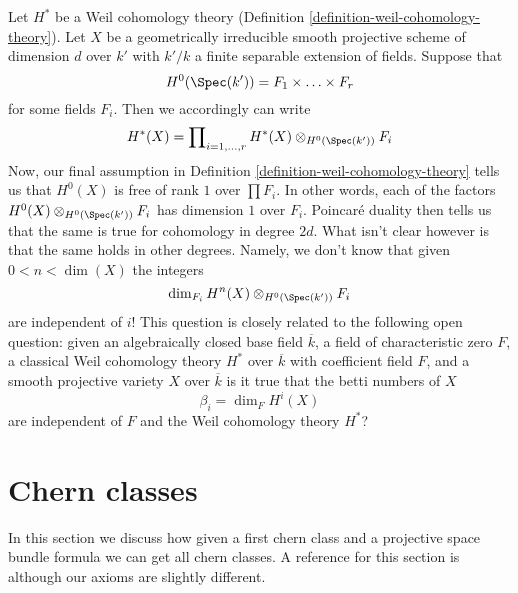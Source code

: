 \begin{remark}
\label{remark-betti-numbers-in-some-sense}
Let $H^*$ be a Weil cohomology theory
(Definition \ref{definition-weil-cohomology-theory}).
Let $X$ be a geometrically irreducible smooth projective scheme
of dimension $d$ over $k'$ with $k'/k$ a finite separable extension of fields.
Suppose that
$$
H^0(\Spec(k')) = F_1 \times \ldots \times F_r
$$
for some fields $F_i$. Then we accordingly can write
$$
H^*(X) = \prod\nolimits_{i = 1, \ldots, r}
H^*(X) \otimes_{H^0(\Spec(k'))} F_i
$$
Now, our final assumption in Definition \ref{definition-weil-cohomology-theory}
tells us that $H^0(X)$ is free of rank $1$ over $\prod F_i$.
In other words, each of the factors
$H^0(X) \otimes_{H^0(\Spec(k'))} F_i$ has dimension $1$ over $F_i$.
Poincar\'e duality then tells us that the same is true for
cohomology in degree $2d$.
What isn't clear however is that the same holds in other degrees.
Namely, we don't know that given $0 < n < \dim(X)$ the integers
$$
\dim_{F_i} H^n(X) \otimes_{H^0(\Spec(k'))} F_i
$$
are independent of $i$! This question is closely related to the following
open question: given an algebraically closed base field $\overline{k}$,
a field of characteristic zero $F$, a classical Weil cohomology theory
$H^*$ over $\overline{k}$ with coefficient field $F$, and a smooth projective
variety $X$ over $\overline{k}$ is it true that the betti numbers of $X$
$$
\beta_i = \dim_F H^i(X)
$$
are independent of $F$ and the Weil cohomology theory $H^*$?
\end{remark}






\section{Chern classes}
\label{section-chern}

\noindent
In this section we discuss how given a first chern class and a projective
space bundle formula we can get all chern classes.
A reference for this section is \cite{Grothendieck-chern} although our
axioms are slightly different.

